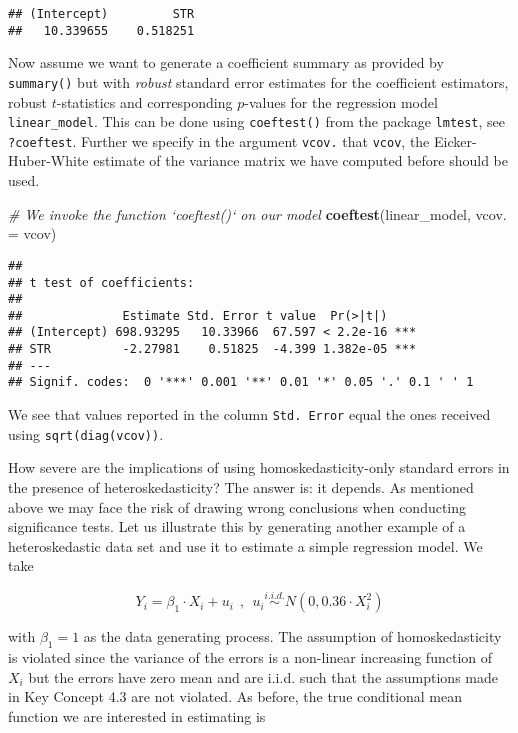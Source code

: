 \documentclass[]{book}
\newenvironment{Shaded}{\begin{snugshade}}{\end{snugshade}}
\newcommand{\KeywordTok}[1]{\textcolor[rgb]{0.13,0.29,0.53}{\textbf{#1}}}
\newcommand{\DataTypeTok}[1]{\textcolor[rgb]{0.13,0.29,0.53}{#1}}
\newcommand{\CommentTok}[1]{\textcolor[rgb]{0.56,0.35,0.01}{\textit{#1}}}
\newcommand{\NormalTok}[1]{#1}
\theoremstyle{definition}
\theoremstyle{definition}
\theoremstyle{definition}
\theoremstyle{remark}
\begin{document}
\begin{verbatim}
## (Intercept)         STR 
##   10.339655    0.518251
\end{verbatim}

Now assume we want to generate a coefficient summary as provided by
\texttt{summary()} but with \emph{robust} standard error estimates for
the coefficient estimators, robust \(t\)-statistics and corresponding
\(p\)-values for the regression model \texttt{linear\_model}. This can
be done using \texttt{coeftest()} from the package \texttt{lmtest}, see
\texttt{?coeftest}. Further we specify in the argument \texttt{vcov.}
that \texttt{vcov}, the Eicker-Huber-White estimate of the variance
matrix we have computed before should be used.

\begin{Shaded}
\begin{Highlighting}[]
\CommentTok{# We invoke the function `coeftest()` on our model}
\KeywordTok{coeftest}\NormalTok{(linear_model, }\DataTypeTok{vcov. =}\NormalTok{ vcov)}
\end{Highlighting}
\end{Shaded}

\begin{verbatim}
## 
## t test of coefficients:
## 
##              Estimate Std. Error t value  Pr(>|t|)    
## (Intercept) 698.93295   10.33966  67.597 < 2.2e-16 ***
## STR          -2.27981    0.51825  -4.399 1.382e-05 ***
## ---
## Signif. codes:  0 '***' 0.001 '**' 0.01 '*' 0.05 '.' 0.1 ' ' 1
\end{verbatim}

We see that values reported in the column \texttt{Std.\ Error} equal the
ones received using \texttt{sqrt(diag(vcov))}.

How severe are the implications of using homoskedasticity-only standard
errors in the presence of heteroskedasticity? The answer is: it depends.
As mentioned above we may face the risk of drawing wrong conclusions
when conducting significance tests. Let us illustrate this by generating
another example of a heteroskedastic data set and use it to estimate a
simple regression model. We take

\[ Y_i = \beta_1 \cdot X_i + u_i \ \ , \ \ u_i \overset{i.i.d.}{\sim} N(0,0.36 \cdot X_i^2)  \]

with \(\beta_1=1\) as the data generating process. The assumption of
homoskedasticity is violated since the variance of the errors is a
non-linear increasing function of \(X_i\) but the errors have zero mean
and are i.i.d. such that the assumptions made in Key Concept 4.3 are not
violated. As before, the true conditional mean function we are
interested in estimating is
\end{document}
